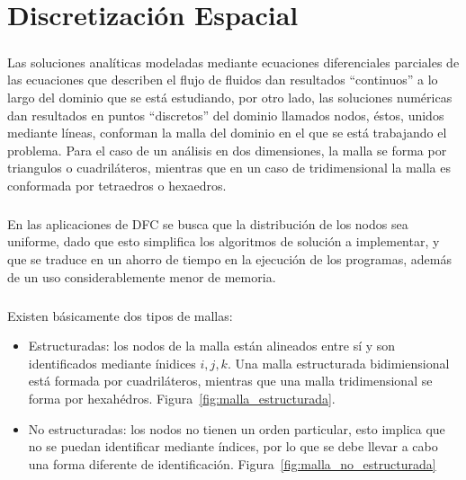 \documentclass[letterpaper, openright, 12pt]{book}
\begin{document}
%
%
%
%
%

%
%
%
%
\chapter{Discretización Espacial}\label{chap:discretizacion-espacial}
    \paragraph*{}
    Las soluciones analíticas modeladas mediante ecuaciones diferenciales
    parciales de las ecuaciones que describen el flujo de fluidos dan resultados
    ``continuos'' a lo largo del dominio que se está estudiando, por otro lado,
    las soluciones numéricas  dan resultados en puntos ``discretos'' del dominio
    llamados nodos, éstos, unidos mediante líneas, conforman la malla del
    dominio en el que se está trabajando el problema. Para el caso de un
    análisis en dos dimensiones, la malla se forma por triangulos o
    cuadriláteros, mientras que en un caso de tridimensional la malla es
    conformada por tetraedros o hexaedros.

    \paragraph*{}
    En las aplicaciones de DFC se busca que la distribución de los nodos sea
    uniforme, dado que esto simplifica los algoritmos de solución a implementar,
    y que se traduce en un ahorro de tiempo en la ejecución de los programas,
    además de un uso considerablemente menor de memoria.

    \paragraph*{}
    Existen básicamente dos tipos de mallas:
    \begin{itemize}
    \item Estructuradas: los nodos de la malla están alineados entre sí y
      son identificados mediante ínidices $i, j, k$. Una malla estructurada
      bidimiensional está formada por cuadriláteros, mientras que una malla
      tridimensional se forma por hexahédros.
            Figura~\ref{fig:malla_estructurada}.
    \item No estructuradas: los nodos no tienen un orden particular, esto
      implica que no se puedan identificar mediante índices, por lo que se debe
      llevar a cabo una forma diferente de identificación.
            Figura~\ref{fig:malla_no_estructurada}
    \end{itemize}
\end{document}
